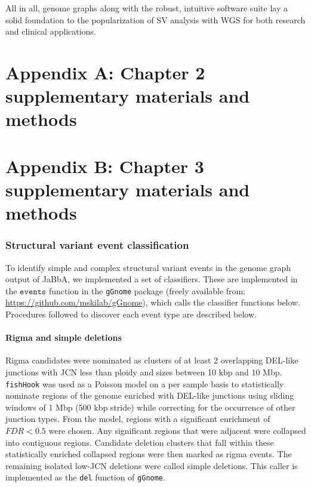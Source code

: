 \documentclass[phd,tocprelim]{cornell}
\newcommand{\ttt}[1]{\texttt{#1}}
\begin{document}
All in all, genome graphs along with the robust, intuitive software suite lay a solid foundation to the popularization of SV analysis with WGS for both research and clinical applications.

\appendix

\chapter*{Appendix A: Chapter 2 supplementary materials and methods} \label{app:a}

\chapter*{Appendix B: Chapter 3 supplementary materials and methods}
\subsection*{Structural variant event classification}
To identify simple and complex structural variant events in the genome graph output of JaBbA, we implemented a set of classifiers.  These are implemented in the $\ttt{events}$ function in the \texttt{gGnome} package (freely available from: \url{https://github.com/mskilab/gGnome}), which calls the classifier functions below. Procedures followed to discover each event type are described below. 

\subsubsection*{Rigma and simple deletions}
Rigma candidates were nominated as clusters of at least 2 overlapping DEL-like junctions with JCN less than ploidy and sizes between 10 kbp and 10 Mbp. \texttt{fishHook} was used as a Poisson model on a per sample basis to statistically nominate regions of the genome enriched with DEL-like junctions using sliding windows of 1 Mbp (500 kbp stride) while correcting for the occurrence of other junction types. From the model, regions with a significant enrichment of $FDR < 0.5$ were chosen. Any significant regions that were adjacent were collapsed into contiguous regions. Candidate deletion clusters that fall within these statistically enriched collapsed regions were then marked as rigma events. The remaining isolated low-JCN deletions were called simple deletions.  This caller is implemented as the \ttt{del} function of \ttt{gGnome}.
\end{document}
